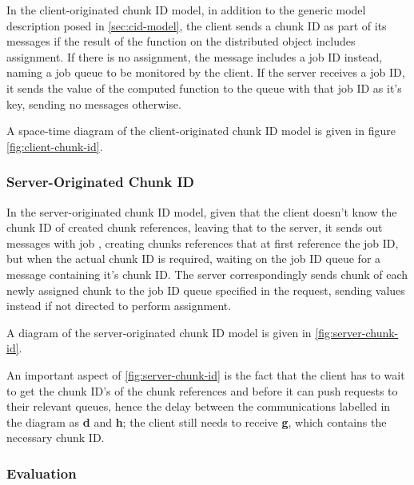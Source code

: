 In the client-originated chunk ID  model, in addition to the generic model
description posed in \cref{sec:cid-model}, the client sends a chunk ID
as part of its messages if the result of the function on the distributed object
includes assignment.
If there is no assignment, the message includes a job ID instead, naming a job
queue to be monitored by the client.
If the server receives a job ID, it sends the value of the computed function to
the queue with that job ID as it's key, sending no messages otherwise.

A space-time diagram of the client-originated chunk ID model is given in figure
\cref{fig:client-chunk-id}.


\subsubsection{Server-Originated Chunk ID}

In the server-originated chunk ID model, given that the client doesn't know the
chunk ID of created chunk references, leaving that to the server, it sends out
messages with job , creating chunks references that at first reference the
job ID, but when the actual chunk ID is required, waiting on the job ID queue
for a message containing it's chunk ID.
The server correspondingly sends chunk  of each newly assigned chunk to the
job ID queue specified in the request, sending values instead if not directed
to perform assignment.

A diagram of the server-originated chunk ID model is given in \cref{fig:server-chunk-id}.


An important aspect of \cref{fig:server-chunk-id} is the fact that the client has to
wait to get the chunk ID's of the chunk references  and 
before it can push requests to their relevant queues, hence the delay between
the communications labelled in the diagram as \textcolor{dark2-3}{\textbf{d}}
and \textcolor{dark2-3}{\textbf{h}}; the client still needs to receive
\textcolor{dark2-1}{\textbf{g}}, which contains the necessary chunk ID.

\subsubsection{Evaluation}\label{sec:mod-eval}

